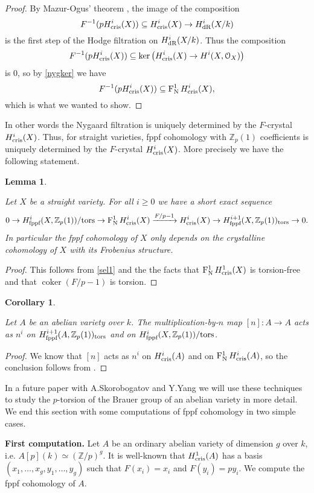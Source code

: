 \documentclass[11pt]{article}
\theoremstyle{plain}
\newtheorem{Cor}[Thm]{Corollary}
\newtheorem{Lem}[Thm]{Lemma}
\theoremstyle{definition}
\theoremstyle{remark}
\numberwithin{equation}{section}
\newenvironment{lemma}[1]%
    { \begin{Lem} \label{L:#1}}%
    { \end{Lem} }
\newcommand{\lem}[1]{\begin{lemma}{#1} \sl}
\newcommand{\elem}{\end{lemma}}
\newenvironment{corol}[1]%
    { \begin{Cor} \label{C:#1}}%
    { \end{Cor} }
\newcommand{\cor}[1]{\begin{corol}{#1} \sl }
\newcommand{\ecor}{\end{corol}}
\newcommand{\prf}{ \begin{proof} }
\newcommand{\epr}{ \end{proof} }
\newcommand\Z{\mathbb{Z}}
\newcommand\calO{\mathcal{O}}
\newcommand{\Zp}{\mathbb{Z}_p}
\newcommand\xto[2]{\xrightarrow[#1]{#2}}
\DeclareMathOperator{\coker}{coker}
\newcommand\Hflat[1]{H^{#1}_{\textnormal{fppf}}}                         %
\newcommand\HdR[1]{H^{#1}_{\textnormal{dR}}}                             %
\DeclareMathOperator{\Nyg}{F_N^1}                                      %
\newcommand\Hcris[1]{H^{#1}_{\textnormal{cris}}}                         %
\begin{document}
\prf
By Mazur-Ogus' theorem \cite[Theorem 8.26]{berthelotogus}, the image of the composition
\[
F^{-1}(p\Hcris{i}(X))\subseteq\Hcris{i}(X)\to\HdR{i}(X/k)
\]
is the first step of the Hodge filtration on $\HdR{i}(X/k)$. Thus the composition
\[
F^{-1}(p\Hcris{i}(X))\subseteq\ker\left(\Hcris{i}(X)\to H^i(X,\calO_X)\right)
\]
is $0$, so by \eqref{nygker} we have
\[
F^{-1}(p\Hcris{i}(X))\subseteq\Nyg{}\Hcris{i}(X),
\]
which is what we wanted to show.
\epr

In other words the Nygaard filtration is uniquely determined by the $F$-crystal $\Hcris{i}(X)$. Thus, for straight varieties, fppf cohomology with $\Zp(1)$ coefficients is uniquely determined by the $F$-crystal $\Hcris{i}(X)$. More precisely we have the following statement.

\lem{fppfstraight}

Let $X$ be a straight variety. For all $i\ge0$ we have a short exact sequence
\[
0\to\Hflat{i}(X,\Zp(1))/\text{tors}\to\Nyg{}\Hcris{i}(X)\xto{}{F/p-1}\Hcris{i}(X)\to\Hflat{i+1}(X,\Zp(1))_{\text{tors}}\to0.
\]
In particular the fppf cohomology of $X$ only depends on the crystalline cohomology of $X$ with its Frobenius structure.

\elem

\prf
This follows from \eqref{sel1} and the the facts that $\Nyg{}\Hcris{1}(X)$ is torsion-free and that $\coker\left(F/p-1\right)$ is torsion. 
\epr

\cor{moltiplicazionen}

Let $A$ be an abelian variety over $k$. The multiplication-by-$n$ map $[n]:A\to A$ acts as $n^{i}$ on $\Hflat{i+1}(A,\Zp(1))_{\text{tors}}$ and on $\Hflat{i}(X,\Zp(1))/\text{tors}$.

\ecor

\prf
We know that $[n]$ acts as $n^i$ on $\Hcris{i}(A)$ and on $\Nyg{}\Hcris{i}(A)$, so the conclusion follows from .
\epr

In a future paper with A.Skorobogatov and Y.Yang we will use these techniques to study the $p$-torsion of the Brauer group of an abelian variety in more detail. We end this section with some computations of fppf cohomology in two simple cases.

\vspace{.5em}
\noindent\textbf{First computation.} Let $A$ be an ordinary abelian variety of dimension $g$ over $k$, i.e. $A[p](k)\simeq(\Z/p)^g$. It is well-known that $\Hcris{1}(A)$ has a basis $(x_1,\dots,x_g,y_1,\dots,y_g)$ such that $F(x_i)=x_i$ and $F(y_i)=py_i$. We compute the fppf cohomology of $A$.
\end{document}

